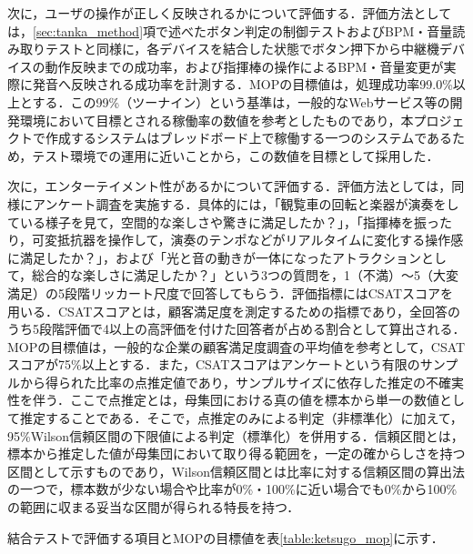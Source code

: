 次に，ユーザの操作が正しく反映されるかについて評価する．評価方法としては，\ref{sec:tanka_method}項で述べたボタン判定の制御テストおよびBPM・音量読み取りテストと同様に，各デバイスを結合した状態でボタン押下から中継機デバイスの動作反映までの成功率，および指揮棒の操作によるBPM・音量変更が実際に発音へ反映される成功率を計測する．MOPの目標値は，処理成功率99.0\%以上とする．この99\%（ツーナイン）という基準は，一般的なWebサービス等の開発環境において目標とされる稼働率の数値を参考としたものであり\cite{kobesoft_availability}，本プロジェクトで作成するシステムはブレッドボード上で稼働する一つのシステムであるため，テスト環境での運用に近いことから，この数値を目標として採用した．

次に，エンターテイメント性があるかについて評価する．評価方法としては，同様にアンケート調査を実施する．具体的には，「観覧車の回転と楽器が演奏をしている様子を見て，空間的な楽しさや驚きに満足したか？」，「指揮棒を振ったり，可変抵抗器を操作して，演奏のテンポなどがリアルタイムに変化する操作感に満足したか？」，および「光と音の動きが一体になったアトラクションとして，総合的な楽しさに満足したか？」という3つの質問を，1（不満）〜5（大変満足）の5段階リッカート尺度で回答してもらう．評価指標にはCSATスコアを用いる．CSATスコアとは，顧客満足度を測定するための指標であり，全回答のうち5段階評価で4以上の高評価を付けた回答者が占める割合として算出される．MOPの目標値は，一般的な企業の顧客満足度調査の平均値を参考として，CSATスコアが75\%以上\cite{acsi}とする．また，CSATスコアはアンケートという有限のサンプルから得られた比率の点推定値であり，サンプルサイズに依存した推定の不確実性を伴う．ここで点推定とは，母集団における真の値を標本から単一の数値として推定することである．そこで，点推定のみによる判定（非標準化）に加えて，95\%Wilson信頼区間\cite{wilson1927}の下限値による判定（標準化）を併用する．信頼区間とは，標本から推定した値が母集団において取り得る範囲を，一定の確からしさを持つ区間として示すものであり，Wilson信頼区間とは比率に対する信頼区間の算出法の一つで，標本数が少ない場合や比率が0\%・100\%に近い場合でも0\%から100\%の範囲に収まる妥当な区間が得られる特長を持つ．

結合テストで評価する項目とMOPの目標値を表\ref{table:ketsugo_mop}に示す．

